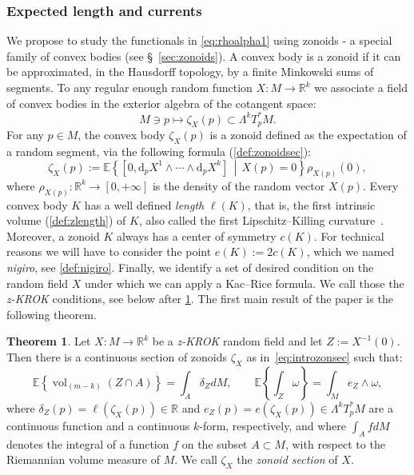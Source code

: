 \documentclass[10pt]{amsart}
\theoremstyle{definition}\newtheorem{defi}[theo]{Definition}\newtheorem{rema}[theo]{Remark}\newtheorem{exam}[theo]{Example}\newtheorem{exem}[theo]{Example}\newtheorem{nota}[theo]{Notation}
\newtheorem{mainthm}{Theorem}
\newcommand{\R}{\mathbb{R}}
\newcommand{\EE}{\mathbb{E}}
\newcommand{\dd}{\mathrm{d}}
\DeclareMathOperator{\vol}{vol}
\newcommand{\zkrok}{\emph{z-KROK}\xspace}
\begin{document}
\subsubsection{Expected length and currents}

We propose to study the functionals in \eqref{eq:rhoalpha1} using zonoids - a special family of convex bodies (see \S~\ref{sec:zonoids}). A convex body is a zonoid if it can be approximated, in the Hausdorff topology, by a finite Minkowski sums of segments. To any regular enough random function $X\colon M\to \R^k$ we associate a field of convex bodies in the exterior algebra of the cotangent space:
\begin{equation*}
M\ni p\mapsto \zeta_X(p)\subset \Lambda^kT^*_pM.
\end{equation*}
For any $p\in M$, the convex body $\zeta_X(p)$ is a zonoid defined as the expectation of a random segment, via the following formula (\cref{def:zonoidsec}):
\begin{equation}\label{eq:introzonsec}
\zeta_X(p):=\EE\left\{\left[0,\dd_pX^1\wedge\cdots\wedge\dd_p X^k\right]\,\middle|\,X(p)=0\right\}\rho_{X(p)}(0),
\end{equation}
where $\rho_{X(p)}:\R^k\to [0,+\infty]$ is the density of the random vector $X(p)$. Every convex body $K$ has a well defined \emph{length} $\ell(K)$, that is, the first intrinsic volume (\cref{def:zlength}) of $K$, also called the first Lipschitz--Killing curvature~\cite{AdlerTaylor}. Moreover, a zonoid $K$ always has a center of symmetry $c(K)$. For technical reasons we will have to consider the point $e(K):=2c(K)$, which we named \emph{nigiro}, see \cref{def:nigiro}. Finally, we identify a set of desired condition on the random field $X$ under which we can apply a Kac--Rice formula. We call those the \zkrok conditions, see below after \cref{thm:1}. The first main result of the paper is the following theorem.

\begin{mainthm}\label{thm:1}
Let $X\colon M \to \R^k$ be a \zkrok random field and let $Z:=X^{-1}(0)$. Then there is a continuous section of zonoids $\zeta_X$ as in~\eqref{eq:introzonsec} such that:
\begin{equation}\label{eq:rhoalpha}
\EE\left\{\vol_{(m-k)}(Z\cap A)\right\}=\int_A \delta_Z dM, \qquad \EE\left\{\int_{Z} \omega\right\}=\int_M e_Z\wedge \omega,
\end{equation}
where $\delta_Z(p)=\ell(\zeta_X(p))\in \R$ and $e_Z(p)=e(\zeta_X(p))\in \Lambda^kT^*_pM$ are a continuous function and a continuous $k$-form, respectively, and where $\int_AfdM$ denotes the integral of a function $f$ on the subset $A\subset M$, with respect to the Riemannian volume measure of $M$. We call $\zeta_X$ the \emph{zonoid section} of $X$.
\end{mainthm}
\end{document}
